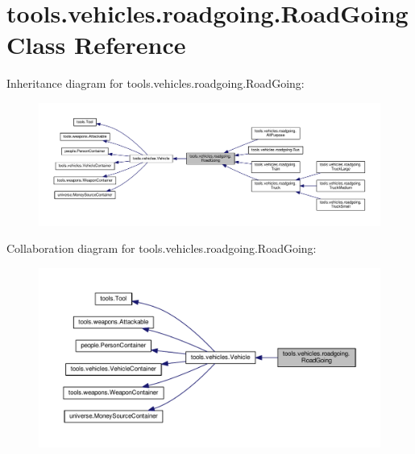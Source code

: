 \hypertarget{classtools_1_1vehicles_1_1roadgoing_1_1_road_going}{}\section{tools.\+vehicles.\+roadgoing.\+Road\+Going Class Reference}
\label{classtools_1_1vehicles_1_1roadgoing_1_1_road_going}


Inheritance diagram for tools.\+vehicles.\+roadgoing.\+Road\+Going\+:\nopagebreak
\begin{figure}[H]
\begin{center}
\leavevmode
\includegraphics[width=350pt]{classtools_1_1vehicles_1_1roadgoing_1_1_road_going__inherit__graph}
\end{center}
\end{figure}


Collaboration diagram for tools.\+vehicles.\+roadgoing.\+Road\+Going\+:\nopagebreak
\begin{figure}[H]
\begin{center}
\leavevmode
\includegraphics[width=350pt]{classtools_1_1vehicles_1_1roadgoing_1_1_road_going__coll__graph}
\end{center}
\end{figure}
